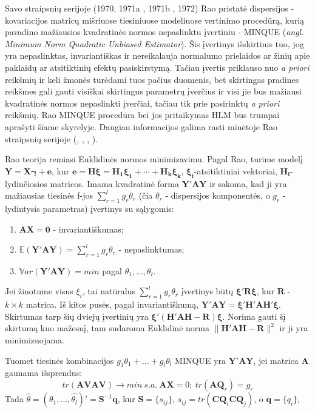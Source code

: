 \documentclass[11pt,a4paper]{article}
\begin{document}
\indent Savo straipsnių serijoje (1970\cite{rao1970}, 1971a\cite{rao1971a} , 1971b\cite{rao1971b} , 1972\cite{rao1972}) Rao pristatė dispersijos - kovariacijos matricų mišriuose tiesiniuose modeliuose vertinimo procedūrą, kurią pavadino mažiausios kvadratinės normos nepaslinktu įvertiniu - MINQUE (\textit{angl. Minimum Norm Quadratic Unbiased Estimator}). Šis įvertinys išskirtinis tuo, jog yra nepaslinktas, invariantiškas ir nereikalauja normalumo prielaidos ar žinių apie paklaidų ar atsitiktinių efektų pasiskirstymą. Tačiau įvertis priklauso nuo \textit{a priori} reikšmių ir keli žmonės turėdami tuos pačius duomenis, bet skirtingas pradines reikšmes gali gauti visiškai skirtingus parametrų įverčius ir visi jie bus mažiausi kvadratinės normos nepaslinkti įverčiai, tačiau tik prie pasirinktų \textit{a priori} reikšmių. Rao MINQUE procedūra bei jos pritaikymas HLM bus trumpai aprašyti šiame skyrelyje. Daugiau informacijos galima rasti minėtoje Rao straipsnių serijoje (\cite{rao1970}, \cite{rao1971a} , \cite{rao1971b} , \cite{rao1972}).

\indent Rao teorija remiasi Euklidinės normos minimizavimu. Pagal Rao, turime modelį $\mathbf{Y}=\mathbf{X}\boldsymbol{\gamma}+\mathbf{e}$, kur $\mathbf{e}=\mathbf{H\boldsymbol{\xi}}=\mathbf{\boldsymbol{H_1\xi_1+\cdots +H_k \xi_k}}$, $\boldsymbol{\xi_i}$-atsitiktiniai vektoriai, $\mathbf{H_i}$-lydinčiosios matricos. Imama kvadratinė forma $\mathbf{Y'AY}$ ir sakoma, kad ji yra mažiausias tiesinės f-jos $\sum^l_{r=1} g_r\theta_r$ (čia $\theta_r$ - dispersijos komponentės, o $g_r$ - lydintysis parametras) įvertinys su sąlygomis:
\begin{enumerate}
\item $\mathbf{AX=0}$ - invariantiškumas;
\item $\mathbb{E}\left(\mathbf{Y'AY}\right)=\sum^l_{r=1} g_r\theta_r$ - nepaslinktumas;
\item $\mathbb{V}ar\left(\mathbf{Y'AY}\right)=min$ pagal $\theta_1, \dots, \theta_l$.
\end{enumerate}

\indent Jei žinotume visus $\xi_i$, tai natūralus $\sum^l_{r=1} g_r\theta_r$ įvertinys būtų $\boldsymbol{\xi'R\xi}$, kur $\mathbf{R}$ - $k\times k$ matrica. Iš kitos pusės, pagal invariantiškumą, $\mathbf{Y'AY=\boldsymbol{\xi'H'AH'\xi}}$. Skirtumas tarp šių dviejų įvertinių yra $\boldsymbol{\xi'\left(H'AH-R\right)\xi}$. Norima gauti šį skirtumą kuo mažesnį, tam sudaroma Euklidinė norma $\|\boldsymbol{H'AH-R}\|^2$ ir ji yra minimizuojama.

\indent Tuomet tiesinės kombinacijos $g_1 \theta_1+\dots+g_l \theta_l$ MINQUE yra $\mathbf{Y'AY}$, jei matrica $\mathbf{A}$ gaunama išsprendus:
\[tr(\mathbf{AVAV}) \to min \ s.a. \ \mathbf{AX} = 0;\ tr(\mathbf{AQ}_r)=g_r\]
\indent Tada $\hat{\theta} = (\hat{\theta_1},\dots,\hat{\theta_l})'=\mathbf{S}^{-1}\mathbf{q}$, kur $\mathbf{S}=\{s_{ij}\}$, $s_{ij}=tr(\mathbf{CQ}_i\mathbf{CQ}_j)$, o
$\mathbf{q}=\{q_i\}$,
\end{document}
